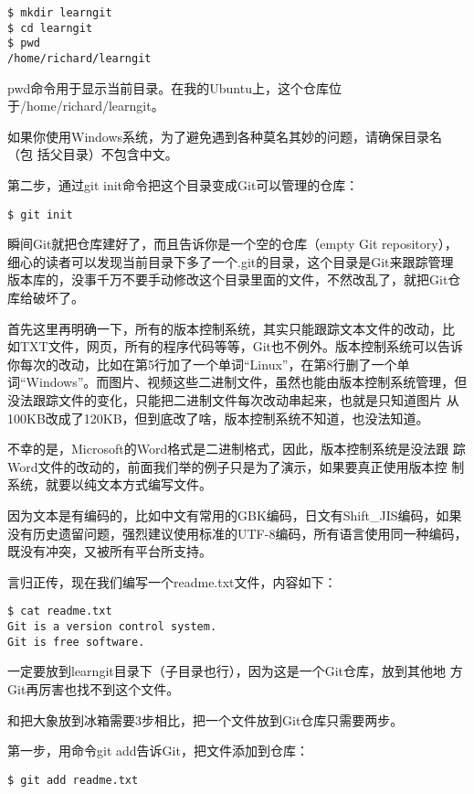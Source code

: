 \begin{verbatim}
$ mkdir learngit
$ cd learngit
$ pwd
/home/richard/learngit
\end{verbatim}

pwd命令用于显示当前目录。在我的Ubuntu上，这个仓库位
于/home/richard/learngit。

如果你使用Windows系统，为了避免遇到各种莫名其妙的问题，请确保目录名（包
括父目录）不包含中文。

第二步，通过git init命令把这个目录变成Git可以管理的仓库：

\begin{verbatim}
$ git init
\end{verbatim}

瞬间Git就把仓库建好了，而且告诉你是一个空的仓库（empty Git repository），
细心的读者可以发现当前目录下多了一个.git的目录，这个目录是Git来跟踪管理
版本库的，没事千万不要手动修改这个目录里面的文件，不然改乱了，就把Git仓
库给破坏了。

首先这里再明确一下，所有的版本控制系统，其实只能跟踪文本文件的改动，比
如TXT文件，网页，所有的程序代码等等，Git也不例外。版本控制系统可以告诉
你每次的改动，比如在第5行加了一个单词“Linux”，在第8行删了一个单
词“Windows”。而图片、视频这些二进制文件，虽然也能由版本控制系统管理，但
没法跟踪文件的变化，只能把二进制文件每次改动串起来，也就是只知道图片
从100KB改成了120KB，但到底改了啥，版本控制系统不知道，也没法知道。

不幸的是，Microsoft的Word格式是二进制格式，因此，版本控制系统是没法跟
踪Word文件的改动的，前面我们举的例子只是为了演示，如果要真正使用版本控
制系统，就要以纯文本方式编写文件。

因为文本是有编码的，比如中文有常用的GBK编码，日文有Shift\_JIS编码，如果
没有历史遗留问题，强烈建议使用标准的UTF-8编码，所有语言使用同一种编码，
既没有冲突，又被所有平台所支持。

言归正传，现在我们编写一个readme.txt文件，内容如下：

\begin{verbatim}
$ cat readme.txt
Git is a version control system.
Git is free software.
\end{verbatim}

一定要放到learngit目录下（子目录也行），因为这是一个Git仓库，放到其他地
方Git再厉害也找不到这个文件。

和把大象放到冰箱需要3步相比，把一个文件放到Git仓库只需要两步。

第一步，用命令git add告诉Git，把文件添加到仓库：

\begin{verbatim}
$ git add readme.txt
\end{verbatim}

